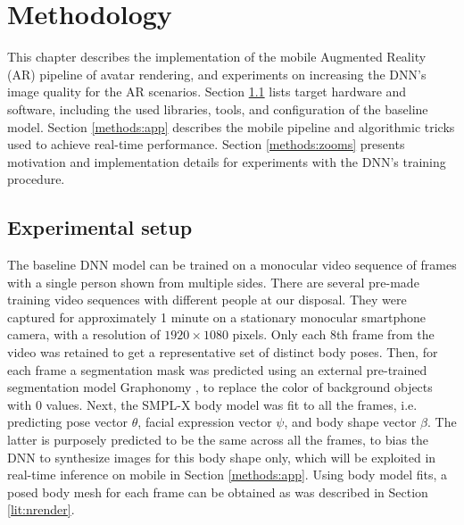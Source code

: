 \chapter{Methodology}\label{chapter:methods}

This chapter describes the implementation of the mobile Augmented Reality (AR) pipeline of avatar rendering, and experiments on increasing the DNN's \cite{dnn:stylepeople21} image quality for the AR scenarios. Section \ref{methods:dev-setup} lists target hardware and software, including the used libraries, tools, and configuration of the baseline model. Section \ref{methods:app} describes the mobile pipeline and algorithmic tricks used to achieve real-time performance. Section \ref{methods:zooms} presents motivation and implementation details for experiments with the DNN's training procedure.

\section{Experimental setup}\label{methods:dev-setup}

The baseline DNN \cite{dnn:stylepeople21} model can be trained on a monocular video sequence of frames with a single person shown from multiple sides. There are several pre-made training video sequences with different people at our disposal. They were captured for approximately 1 minute on a stationary monocular smartphone camera, with a resolution of $1920 \times 1080$ pixels. Only each 8th frame from the video was retained to get a representative set of distinct body poses. Then, for each frame a segmentation mask was predicted using an external pre-trained segmentation model Graphonomy \cite{dnn:graphonomy19}, to replace the color of background objects with 0 values. Next, the SMPL-X \cite{dnn:smplx19} body model was fit to all the frames, i.e. predicting pose vector $\theta$, facial expression vector $\psi$, and body shape vector $\beta$. The latter is purposely predicted to be the same across all the frames, to bias the DNN to synthesize images for this body shape only, which will be exploited in real-time inference on mobile in Section \ref{methods:app}. Using body model fits, a posed body mesh for each frame can be obtained as was described in Section \ref{lit:nrender}. 

